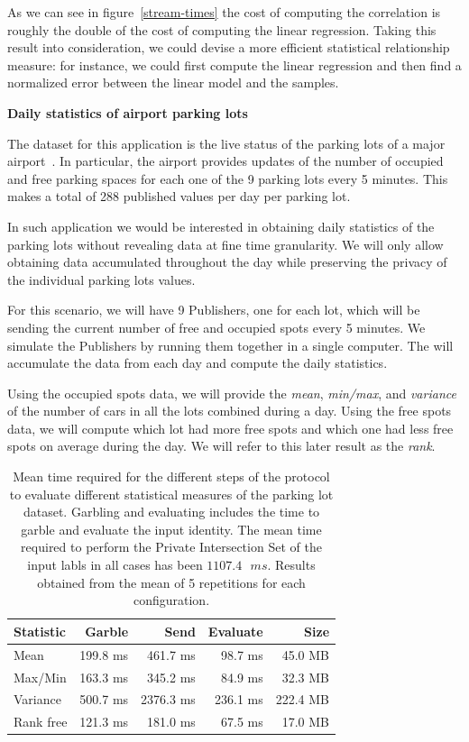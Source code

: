 As we can see in figure~\ref{stream-times} the cost of computing the
correlation is roughly the double of the cost of computing the linear
regression.  Taking this result into consideration, we could devise a more
efficient statistical relationship measure: for instance, we could first
compute the linear regression and then find a normalized error between the
linear model and the samples.

\smallskip
\noindent\textbf{Daily statistics of airport parking lots}

\noindent The dataset for this application is the live status of the parking
lots of a major airport~\cite{LAX}.  In particular, the airport provides
updates of the number of occupied and free parking spaces for each one of the 9
parking lots every 5 minutes.  This makes a total of 288 published values per
day per parking lot.

In such application we would be interested in obtaining daily statistics of the
parking lots without revealing data at fine time granularity.  We will only
allow obtaining data accumulated throughout the day while preserving the
privacy of the individual parking lots values.

For this scenario, we will have 9 Publishers, one for each lot, which will be
sending the current number of free and occupied spots every 5 minutes.  We
simulate the Publishers by running them together in a single computer.  The
\broker will accumulate the data from each day and compute the daily statistics.

Using the occupied spots data, we will provide the \emph{mean}, \emph{min/max},
and \emph{variance} of the number of cars in all the lots combined during a
day.  Using the free spots data, we will compute which lot had more free spots
and which one had less free spots on average during the day.  We will refer to
this later result as the \emph{rank}.

\begin{table}
    \begin{tabular}{l*{3}{r}r}
    \textbf{Statistic}  & \textbf{Garble} & \textbf{Send} & \textbf{Evaluate} & \textbf{Size} \\
    \hline
    Mean       & 199.8 ms & 461.7 ms & 98.7  ms & 45.0 MB \\
    Max/Min    & 163.3 ms & 345.2 ms & 84.9  ms & 32.3 MB \\
    Variance   & 500.7 ms & 2376.3 ms & 236.1 ms & 222.4 MB \\
    \hline
    Rank free  & 121.3 ms & 181.0 ms & 67.5 ms & 17.0 MB \\
    \end{tabular}
    \caption{Mean time required for the different steps of the protocol to
      evaluate different statistical measures of the parking lot dataset.
      Garbling and evaluating includes the time to garble and evaluate the
      input identity.  The mean time required to perform the Private
      Intersection Set of the input labls in all cases has been 
      \mbox{$1107.4 \text{ } ms$}.  Results obtained from the mean of 5 repetitions for
      each configuration.}
    \label{stats-times}
\end{table}

